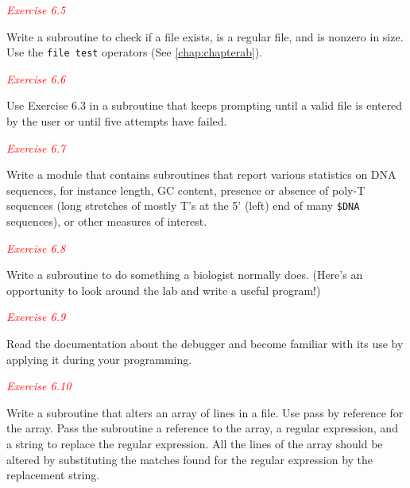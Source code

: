 \textcolor{red}{\textit{Exercise 6.5}}
\begin{adjustwidth}{1cm}{}
Write a subroutine to check if a file exists, is a regular file, and is nonzero in size. Use the \verb|file test| operators (See \autoref{chap:chapterab}). 
\end{adjustwidth}

\textcolor{red}{\textit{Exercise 6.6}}
\begin{adjustwidth}{1cm}{}
Use Exercise 6.3 in a subroutine that keeps prompting until a valid file is entered by the user or until five attempts have failed. 
\end{adjustwidth}

\textcolor{red}{\textit{Exercise 6.7}}
\begin{adjustwidth}{1cm}{}
Write a module that contains subroutines that report various statistics on DNA sequences, for instance length, GC content, presence or absence of poly-T sequences (long stretches of mostly T's at the 5' (left) end of many \verb|$DNA| sequences), or other measures of interest. 
\end{adjustwidth}

\textcolor{red}{\textit{Exercise 6.8}}
\begin{adjustwidth}{1cm}{}
Write a subroutine to do something a biologist normally does. (Here's an opportunity to look around the lab and write a useful program!) 
\end{adjustwidth}

\textcolor{red}{\textit{Exercise 6.9}}
\begin{adjustwidth}{1cm}{}
Read the documentation about the debugger and become familiar with its use by applying it during your programming. 
\end{adjustwidth}

\textcolor{red}{\textit{Exercise 6.10}}
\begin{adjustwidth}{1cm}{}
Write a subroutine that alters an array of lines in a file. Use pass by reference for the array. Pass the subroutine a reference to the array, a regular expression, and a string to replace the regular expression. All the lines of the array should be altered by substituting the matches found for the regular expression by the replacement string.
\end{adjustwidth}
